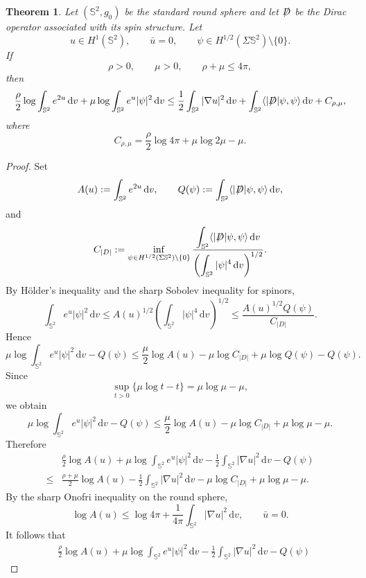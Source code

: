 \documentclass[a4paper, 12pt]{article}
\newtheorem{theorem}{Theorem}[section]
\def\slashiii#1{\setbox0=\hbox{$#1$}#1\hskip-\wd0\hbox to\wd0{\hss\sl/\/\hss}}
\begin{document}
\begin{theorem}\label{SMT}
	Let $(\mathbb{S}^2,g_0)$ be the standard round sphere and let $\slashiii{D}$ be the Dirac operator associated with its spin structure. Let
	\[
	u\in H^1(\mathbb{S}^2),\qquad \bar u=0,\qquad
	\psi\in H^{1/2}(\Sigma \mathbb{S}^2)\setminus\{0\}.
	\]
	If
	\[
	\rho>0,\qquad \mu>0,\qquad \rho+\mu\le 4\pi,
	\]
	then
	\[
	\frac{\rho}{2}\log\int_{\mathbb{S}^2}e^{2u}\,\text{d}v
	+
	\mu\log\int_{\mathbb{S}^2}e^u|\psi|^2\,\text{d}v
	\le
	\frac12\int_{\mathbb{S}^2}|\nabla u|^2\,\text{d}v
	+
	\int_{\mathbb{S}^2}\langle |\slashiii{D}|\psi,\psi\rangle\,\text{d}v
	+
	C_{\rho,\mu},
	\]
	where
	\[{C_{\rho ,\mu }} = \frac{\rho }{2}\log 4\pi  + \mu \log 2\mu  - \mu .\]
\end{theorem}

\begin{proof}
	Set
	\[
	A(u):=\int_{\mathbb{S}^2}e^{2u}\,\text{d}v,
	\qquad
	Q(\psi):=\int_{\mathbb{S}^2}\langle |\slashiii{D}|\psi,\psi\rangle\,\text{d}v ,
	\]
	and
	\[
	C_{|D|}
	:=
	\inf_{\psi\in H^{1/2}(\Sigma \mathbb{S}^2)\setminus\{0\}}
	\frac{\displaystyle\int_{\mathbb{S}^2}\langle |\slashiii{D}|\psi,\psi\rangle\,\text{d}v}
	{\displaystyle\left(\int_{\mathbb{S}^2}|\psi|^4\,\text{d}v\right)^{1/2}} .
	\]
	By H\"older's inequality and the sharp Sobolev inequality for spinors,
	\[
	\int_{\mathbb{S}^2}e^u|\psi|^2\,\text{d}v
	\le
	A(u)^{1/2}
	\left(\int_{\mathbb{S}^2}|\psi|^4\,\text{d}v\right)^{1/2}
	\le
	\frac{A(u)^{1/2}Q(\psi)}{C_{|D|}} .
	\]
	Hence
	\[
	\mu\log\int_{\mathbb{S}^2}e^u|\psi|^2\,\text{d}v - Q(\psi)
	\le
	\frac{\mu}{2}\log A(u)
	-\mu\log C_{|D|}
	+\mu\log Q(\psi)-Q(\psi).
	\]
	Since
	\[
	\sup_{t>0}\{\mu\log t-t\}
	=
	\mu\log\mu-\mu,
	\]
	we obtain
	\[
	\mu\log\int_{\mathbb{S}^2}e^u|\psi|^2\,\text{d}v - Q(\psi)
	\le
	\frac{\mu}{2}\log A(u)
	-\mu\log C_{|D|}
	+\mu\log\mu-\mu .
	\]
	Therefore
	\[
	\begin{aligned}
		&\frac{\rho}{2}\log A(u)
		+\mu\log\int_{\mathbb{S}^2}e^u|\psi|^2\,\text{d}v
		-\frac12\int_{\mathbb{S}^2}|\nabla u|^2\,\text{d}v
		-Q(\psi)
		\\
		\le&
		\frac{\rho+\mu}{2}\log A(u)
		-\frac12\int_{\mathbb{S}^2}|\nabla u|^2\,\text{d}v
		-\mu\log C_{|D|}
		+\mu\log\mu-\mu .
	\end{aligned}
	\]
	By the sharp Onofri inequality on the round sphere,
	\[
	\log A(u)	\le	\log4\pi
	+\frac{1}{4\pi}\int_{\mathbb{S}^2}|\nabla u|^2\,\text{d}v,
	\qquad \bar u=0.
	\]
	It follows that
	\[
	\begin{aligned}
		&\frac{\rho}{2}\log A(u)
		+\mu\log\int_{\mathbb{S}^2}e^u|\psi|^2\,\text{d}v-\frac12\int_{\mathbb{S}^2}|\nabla u|^2\,\text{d}v	-Q(\psi)

\end{aligned}\]
\end{proof}
\end{document}
